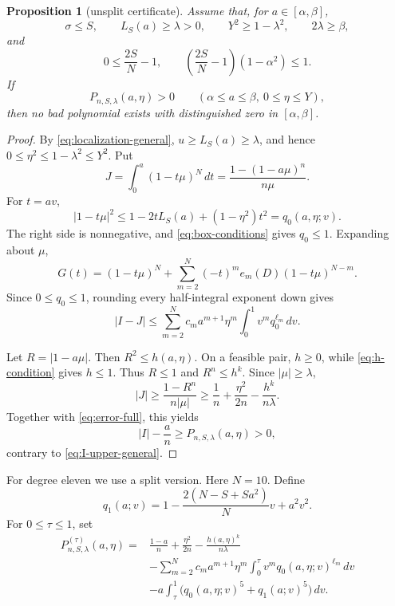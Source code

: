 \documentclass[11pt]{article}
\newtheorem{proposition}[theorem]{Proposition}
\theoremstyle{remark}
\begin{document}
\begin{proposition}[unsplit certificate]\label{prop:full-certificate}
Assume that, for $a\in[\alpha,\beta]$,
\begin{equation}\label{eq:box-conditions}
 \sigma\le S,
 \qquad
 L_S(a)\ge\lambda>0,
 \qquad
 Y^2\ge1-\lambda^2,
 \qquad
 2\lambda\ge\beta,
\end{equation}
and
\begin{equation}\label{eq:h-condition}
 0\le\frac{2S}{N}-1,
 \qquad
 \left(\frac{2S}{N}-1\right)(1-\alpha^2)\le1.
\end{equation}
If
\[
 P_{n,S,\lambda}(a,\eta)>0
 \qquad
 (\alpha\le a\le\beta,\ 0\le\eta\le Y),
\]
then no bad polynomial exists with distinguished zero in
$[\alpha,\beta]$.
\end{proposition}

\begin{proof}
By \eqref{eq:localization-general}, $u\ge L_S(a)\ge\lambda$, and hence
$0\le\eta^2\le1-\lambda^2\le Y^2$.  Put
\[
 J=\int_0^a(1-t\mu)^N\,dt
   =\frac{1-(1-a\mu)^n}{n\mu}.
\]
For $t=av$,
\[
 |1-t\mu|^2
 \le1-2tL_S(a)+(1-\eta^2)t^2=q_0(a,\eta;v).
\]
The right side is nonnegative, and \eqref{eq:box-conditions} gives
$q_0\le1$.  Expanding about $\mu$,
\[
 G(t)=(1-t\mu)^N+
 \sum_{m=2}^N(-t)^me_m(D)(1-t\mu)^{N-m}.
\]
Since $0\le q_0\le1$, rounding every half-integral exponent down gives
\begin{equation}\label{eq:error-full}
 |I-J|\le
 \sum_{m=2}^N c_m a^{m+1}\eta^m
 \int_0^1v^m q_0^{\ell_m}\,dv.
\end{equation}

Let $R=|1-a\mu|$.  Then $R^2\le h(a,\eta)$.  On a feasible pair,
$h\ge0$, while \eqref{eq:h-condition} gives $h\le1$.  Thus $R\le1$ and
$R^n\le h^k$.  Since $|\mu|\ge\lambda$,
\[
 |J|\ge\frac{1-R^n}{n|\mu|}
 \ge\frac1n+\frac{\eta^2}{2n}-\frac{h^k}{n\lambda}.
\]
Together with \eqref{eq:error-full}, this yields
\[
 |I|-\frac an\ge P_{n,S,\lambda}(a,\eta)>0,
\]
contrary to \eqref{eq:I-upper-general}.
\end{proof}

For degree eleven we use a split version.  Here $N=10$.  Define
\begin{equation}\label{eq:q1}
 q_1(a;v)=1-\frac{2(N-S+Sa^2)}N v+a^2v^2.
\end{equation}
For $0\le\tau\le1$, set
\begin{equation}\label{eq:Psplit}
\begin{split}
 P_{n,S,\lambda}^{(\tau)}(a,\eta)
 ={}&\frac{1-a}{n}+\frac{\eta^2}{2n}
 -\frac{h(a,\eta)^k}{n\lambda}\\
 &-\sum_{m=2}^N c_m a^{m+1}\eta^m
 \int_0^\tau v^m q_0(a,\eta;v)^{\ell_m}\,dv\\
 &-a\int_\tau^1\bigl(q_0(a,\eta;v)^5+q_1(a;v)^5\bigr)\,dv.
\end{split}
\end{equation}
\end{document}

